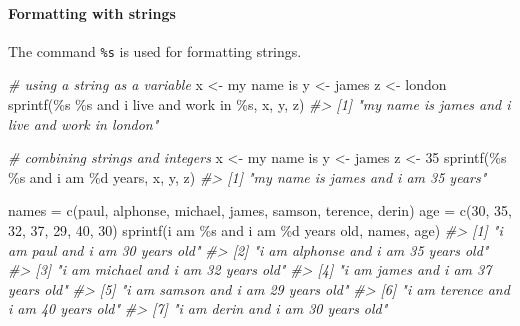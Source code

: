 \documentclass[
]{book}
\newenvironment{Shaded}{\begin{snugshade}}{\end{snugshade}}
\newcommand{\CommentTok}[1]{\textcolor[rgb]{0.56,0.35,0.01}{\textit{#1}}}
\newcommand{\DecValTok}[1]{\textcolor[rgb]{0.00,0.00,0.81}{#1}}
\newcommand{\FunctionTok}[1]{\textcolor[rgb]{0.00,0.00,0.00}{#1}}
\newcommand{\NormalTok}[1]{#1}
\newcommand{\OtherTok}[1]{\textcolor[rgb]{0.56,0.35,0.01}{#1}}
\newcommand{\StringTok}[1]{\textcolor[rgb]{0.31,0.60,0.02}{#1}}
\begin{document}
\hypertarget{formatting-with-strings}{%
\paragraph{Formatting with strings}\label{formatting-with-strings}}

The command \texttt{\%s} is used for formatting strings.

\begin{Shaded}
\begin{Highlighting}[]
\CommentTok{\# using a string as a variable}
\NormalTok{x }\OtherTok{\textless{}{-}} \StringTok{\textquotesingle{}my name is\textquotesingle{}}
\NormalTok{y }\OtherTok{\textless{}{-}} \StringTok{\textquotesingle{}james\textquotesingle{}}
\NormalTok{z }\OtherTok{\textless{}{-}} \StringTok{\textquotesingle{}london\textquotesingle{}}
\FunctionTok{sprintf}\NormalTok{(}\StringTok{\textquotesingle{}\%s \%s and i live and work in \%s\textquotesingle{}}\NormalTok{, x, y, z)}
\CommentTok{\#\textgreater{} [1] "my name is james and i live and work in london"}

\CommentTok{\# combining strings and integers}
\NormalTok{x }\OtherTok{\textless{}{-}} \StringTok{\textquotesingle{}my name is\textquotesingle{}}
\NormalTok{y }\OtherTok{\textless{}{-}} \StringTok{\textquotesingle{}james\textquotesingle{}}
\NormalTok{z }\OtherTok{\textless{}{-}} \DecValTok{35}
\FunctionTok{sprintf}\NormalTok{(}\StringTok{\textquotesingle{}\%s \%s and i am \%d years\textquotesingle{}}\NormalTok{, x, y, z)}
\CommentTok{\#\textgreater{} [1] "my name is james and i am 35 years"}

\NormalTok{names }\OtherTok{=} \FunctionTok{c}\NormalTok{(}\StringTok{\textquotesingle{}paul\textquotesingle{}}\NormalTok{, }\StringTok{\textquotesingle{}alphonse\textquotesingle{}}\NormalTok{, }\StringTok{\textquotesingle{}michael\textquotesingle{}}\NormalTok{, }\StringTok{\textquotesingle{}james\textquotesingle{}}\NormalTok{, }\StringTok{\textquotesingle{}samson\textquotesingle{}}\NormalTok{, }\StringTok{\textquotesingle{}terence\textquotesingle{}}\NormalTok{, }\StringTok{\textquotesingle{}derin\textquotesingle{}}\NormalTok{)}
\NormalTok{age }\OtherTok{=} \FunctionTok{c}\NormalTok{(}\DecValTok{30}\NormalTok{, }\DecValTok{35}\NormalTok{, }\DecValTok{32}\NormalTok{, }\DecValTok{37}\NormalTok{, }\DecValTok{29}\NormalTok{, }\DecValTok{40}\NormalTok{, }\DecValTok{30}\NormalTok{)}
\FunctionTok{sprintf}\NormalTok{(}\StringTok{\textquotesingle{}i am \%s and i am \%d years old\textquotesingle{}}\NormalTok{, names, age)}
\CommentTok{\#\textgreater{} [1] "i am paul and i am 30 years old"    }
\CommentTok{\#\textgreater{} [2] "i am alphonse and i am 35 years old"}
\CommentTok{\#\textgreater{} [3] "i am michael and i am 32 years old" }
\CommentTok{\#\textgreater{} [4] "i am james and i am 37 years old"   }
\CommentTok{\#\textgreater{} [5] "i am samson and i am 29 years old"  }
\CommentTok{\#\textgreater{} [6] "i am terence and i am 40 years old" }
\CommentTok{\#\textgreater{} [7] "i am derin and i am 30 years old"}
\end{Highlighting}
\end{Shaded}
\end{document}

